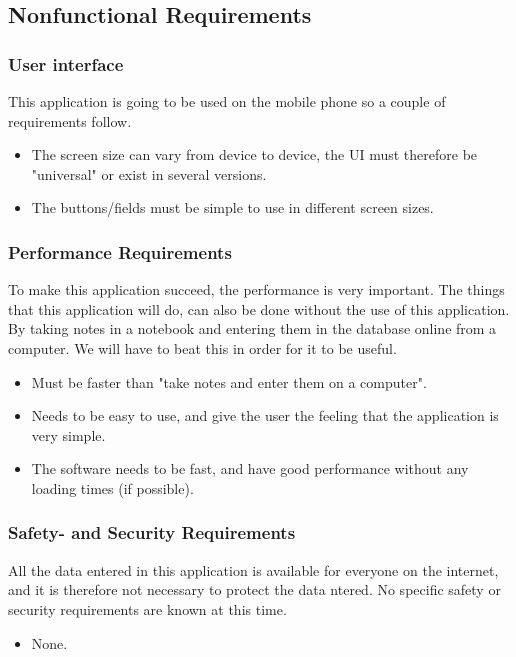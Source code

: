 \subsection{Nonfunctional Requirements}

\subsubsection{User interface}
	This application is going to be used on the mobile phone so a couple of requirements follow.
	\begin{itemize}
		\item The screen size can vary from device to device, the UI must therefore be "universal" or exist in several versions. 
		\item The buttons/fields must be simple to use in different screen sizes.
	\end{itemize}
\subsubsection{Performance Requirements}
	To make this application succeed, the performance is very important. The things that this application will do, can also be done without the use of this application. By taking notes in a notebook and entering them in the database online from a computer. We will have to beat this in order for it to be useful.
	\begin{itemize}
		\item Must be faster than "take notes and enter them on a computer".
		\item Needs to be easy to use, and give the user the feeling that the application is very simple.
		\item The software needs to be fast, and have good performance without any loading times (if possible).
	\end{itemize}

\subsubsection{ Safety- and Security Requirements}
	All the data entered in this application  is available for everyone on the internet, and it is therefore not necessary to protect the data ntered. No specific safety or security requirements are known at this time.
	\begin{itemize}
		\item None.
	\end{itemize}
